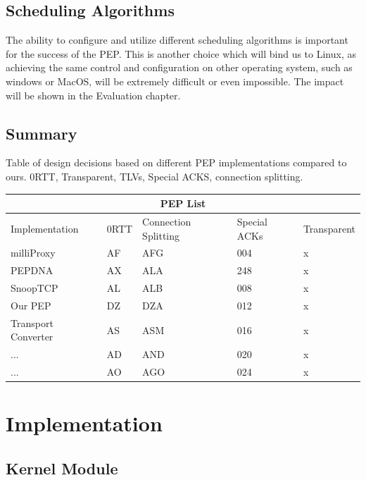 \documentclass[a4paper,english, 11pt]{report}
\begin{document}
\section{Scheduling Algorithms}
The ability to configure and utilize different scheduling algorithms is important for the success of the PEP. This is another choice which will bind us to Linux, as achieving the same control and configuration on other operating system, such as windows or MacOS, will be extremely difficult or even impossible. The impact will be shown in the Evaluation chapter.



\section{Summary}

{Table of design decisions based on different PEP implementations compared to ours.}
{0RTT, Transparent, TLVs, Special ACKS, connection splitting.}\\
\begin{tabular}{ |p{4cm}||p{2cm}|p{2cm}|p{2cm}|p{2cm}| }
 \hline
 \multicolumn{5}{|c|}{PEP List} \\
 \hline
 Implementation& 0RTT &Connection Splitting &Special ACKs &Transparent\\
 \hline
 milliProxy   & AF    &AFG&   004 & x\\
 PEPDNA&   AX  & ALA   &248 & x\\
 SnoopTCP &AL & ALB&  008 & x\\
 Our PEP    &DZ & DZA&  012& x \\
 Transport Converter &   AS  & ASM&016& x\\
 ...& AD  & AND   &020& x\\
 ...& AO  & AGO&024& x\\
 \hline
\end{tabular}

\chapter{Implementation}

\section{Kernel Module}
\end{document}
